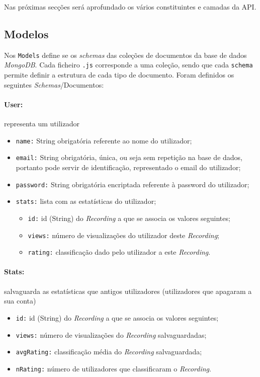 \documentclass{article}
\begin{document}
Nas próximas secções será aprofundado os vários constituintes e camadas da API.

\subsection{Modelos}

Nos \texttt{Models} define se os \textit{schemas} das coleções de documentos da base de dados \textit{MongoDB}. Cada ficheiro \texttt{.js} corresponde a uma coleção, sendo que cada \texttt{schema} permite definir a estrutura de cada tipo de documento. Foram definidos os seguintes \textit{Schemas}/Documentos:

\paragraph{\textbf{User:}} representa um utilizador
    \begin{itemize}
        \item \texttt{name:} String obrigatória referente ao nome do utilizador;
        \item \texttt{email:} String obrigatória, única, ou seja sem repetição na base de dados, portanto pode servir de identificação, representado o email do utilizador;
        \item \texttt{password:} String obrigatória encriptada referente à password do utilizador;
        \item \texttt{stats:} lista com as estatísticas do utilizador;
            \begin{itemize}
                \item \texttt{id:} id (String) do \textit{Recording} a que se associa os valores seguintes;
                \item \texttt{views:} número de visualizações do utilizador deste \textit{Recording};
                \item \texttt{rating:} classificação dado pelo utilizador a este \textit{Recording}.
            \end{itemize}
    \end{itemize}

\paragraph{\textbf{Stats:}} salvaguarda as estatísticas que antigos utilizadores (utilizadores que apagaram a sua conta)
    \begin{itemize}
        \item \texttt{id:} id (String) do \textit{Recording} a que se associa os valores seguintes;
        \item \texttt{views:} número de visualizações do \textit{Recording} salvaguardadas;
        \item \texttt{avgRating:} classificação média do \textit{Recording} salvaguardada;
        \item \texttt{nRating:} número de utilizadores que classificaram o \textit{Recording}.
    \end{itemize}
\end{document}

